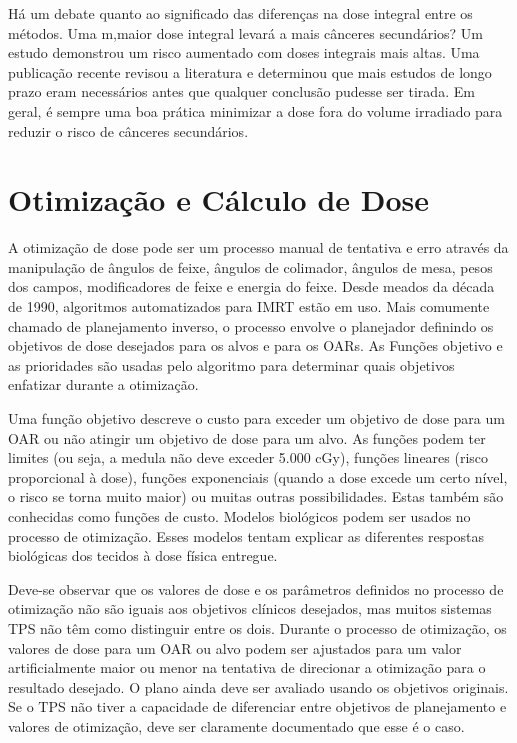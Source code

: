 \documentclass[11pt,a4paper]{article}
\begin{document}
	Há um debate quanto ao significado das diferenças na dose integral entre os métodos. Uma m,maior dose integral levará a mais cânceres secundários? Um estudo demonstrou um risco aumentado com doses integrais mais altas. Uma publicação recente revisou a literatura e determinou que mais estudos de longo prazo eram necessários antes que qualquer conclusão pudesse ser tirada. Em geral, é sempre uma boa prática minimizar a dose fora do volume irradiado para reduzir o risco de cânceres secundários.

\section{Otimização e Cálculo de Dose}

	A otimização de dose pode ser um processo manual de tentativa e erro através da manipulação de ângulos de feixe, ângulos de colimador, ângulos de mesa, pesos dos campos, modificadores de feixe e energia do feixe. Desde meados da década de 1990, algoritmos automatizados para IMRT estão em uso. Mais comumente chamado de planejamento inverso, o processo envolve o planejador definindo os objetivos de dose desejados para os alvos e para os OARs. As Funções objetivo e as prioridades são usadas pelo algoritmo para determinar quais objetivos enfatizar durante a otimização.
	
	Uma função objetivo descreve o custo para exceder um objetivo de dose para um OAR ou não atingir um objetivo de dose para um alvo. As funções podem ter limites (ou seja, a medula não deve exceder 5.000 cGy), funções lineares (risco proporcional à dose), funções exponenciais (quando a dose excede um certo nível, o risco se torna muito maior) ou muitas outras possibilidades. Estas também são conhecidas como funções de custo. Modelos biológicos podem ser usados no processo de otimização. Esses modelos tentam explicar as diferentes respostas biológicas dos tecidos à dose física entregue.

	Deve-se observar que os valores de dose e os parâmetros definidos no processo de otimização não são iguais aos objetivos clínicos desejados, mas muitos sistemas TPS não têm como distinguir entre os dois. Durante o processo de otimização, os valores de dose para um OAR ou alvo podem ser ajustados para um valor artificialmente maior ou menor na tentativa de direcionar a otimização para o resultado desejado. O plano ainda deve ser avaliado usando os objetivos originais. Se o TPS não tiver a capacidade de diferenciar entre objetivos de planejamento e valores de otimização, deve ser claramente documentado que esse é o caso.
\end{document}

